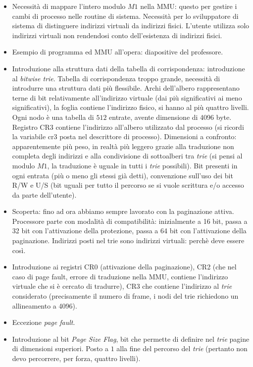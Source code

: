 \begin{itemize}
\begin{itemize}
		\item Necessità di mappare l'intero modulo $M1$ nella MMU: questo per gestire i cambi di processo nelle routine di sistema. Necessità per lo sviluppatore di sistema di distinguere indirizzi virtuali da indirizzi fisici. L'utente utilizza solo indirizzi virtuali non rendendosi conto dell'esistenza di indirizzi fisici.
		\item Esempio di programma ed MMU all'opera: diapositive del professore. 
		\item Introduzione alla struttura dati della tabella di corrispondenza: introduzione al \emph{bitwise trie}. Tabella di corrispondenza troppo grande, necessità di introdurre una struttura dati più flessibile. Archi dell'albero rappresentano terne di bit relativamente all'indirizzo virtuale (dai più significativi ai meno significativi), la foglia contiene l'indirizzo fisico, si hanno al più quattro livelli. Ogni nodo è una tabella di $512$ entrate, avente dimensione di 4096 byte. Registro CR3 contiene l'indirizzo all'albero utilizzato dal processo (si ricordi la variabile cr3 posta nel descrittore di processo). Dimensioni a confronto: apparentemente più peso, in realtà più leggero grazie alla traduzione non completa degli indirizzi e alla condivisione di sottoalberi tra \emph{trie} (si pensi al modulo $M1$, la traduzione è uguale in tutti i \emph{trie} possibili). Bit presenti in ogni entrata (più o meno gli stessi già detti), convenzione sull'uso dei bit R/W e U/S (bit uguali per tutto il percorso se si vuole scrittura e/o accesso da parte dell'utente).
		\item Scoperta: fino ad ora abbiamo sempre lavorato con la paginazione attiva. Processore parte con modalità di compatibilità: inizialmente a 16 bit, passa a 32 bit con l'attivazione della protezione, passa a 64 bit con l'attivazione della paginazione. Indirizzi posti nel trie sono indirizzi virtuali: perchè deve essere così.
		\item Introduzione ai registri CR0 (attivazione della paginazione), CR2 (che nel caso di page fault, errore di traduzione nella MMU, contiene l'indirizzo virtuale che si è cercato di tradurre), CR3 che contiene l'indirizzo al \emph{trie} considerato (precisamente il numero di frame, i nodi del trie richiedono un allineamento a 4096). 
		\item Eccezione \emph{page fault}.
		\item Introduzione al bit \emph{Page Size Flag}, bit che permette di definire nel \emph{trie} pagine di dimensioni superiori. Posto a $1$ alla fine del percorso del \emph{trie} (pertanto non devo percorrere, per forza, quattro livelli).

\end{itemize}
\end{itemize}
